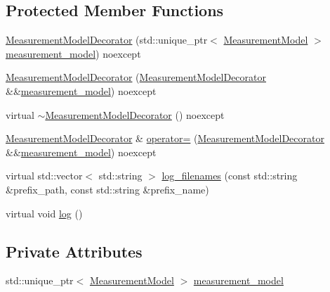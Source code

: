 \subsection*{Protected Member Functions}
\begin{DoxyCompactItemize}
\item 
\mbox{\hyperlink{classbfl_1_1MeasurementModelDecorator_aa49bbe1d5b707aa4419e1bee6a11ecad}{Measurement\+Model\+Decorator}} (std\+::unique\+\_\+ptr$<$ \mbox{\hyperlink{classbfl_1_1MeasurementModel}{Measurement\+Model}} $>$ \mbox{\hyperlink{classbfl_1_1MeasurementModelDecorator_a7d85e1d15d21ba2d0a70f86368628cf7}{measurement\+\_\+model}}) noexcept
\item 
\mbox{\hyperlink{classbfl_1_1MeasurementModelDecorator_ad2b03c9843ee16fe2253ea9b0bd18031}{Measurement\+Model\+Decorator}} (\mbox{\hyperlink{classbfl_1_1MeasurementModelDecorator}{Measurement\+Model\+Decorator}} \&\&\mbox{\hyperlink{classbfl_1_1MeasurementModelDecorator_a7d85e1d15d21ba2d0a70f86368628cf7}{measurement\+\_\+model}}) noexcept
\item 
virtual \mbox{\hyperlink{classbfl_1_1MeasurementModelDecorator_ac32603f06174b8eba271d5237d0ef566}{$\sim$\+Measurement\+Model\+Decorator}} () noexcept
\item 
\mbox{\hyperlink{classbfl_1_1MeasurementModelDecorator}{Measurement\+Model\+Decorator}} \& \mbox{\hyperlink{classbfl_1_1MeasurementModelDecorator_a6878f03475e8bb85719af07e5313f665}{operator=}} (\mbox{\hyperlink{classbfl_1_1MeasurementModelDecorator}{Measurement\+Model\+Decorator}} \&\&\mbox{\hyperlink{classbfl_1_1MeasurementModelDecorator_a7d85e1d15d21ba2d0a70f86368628cf7}{measurement\+\_\+model}}) noexcept
\item 
virtual std\+::vector$<$ std\+::string $>$ \mbox{\hyperlink{classbfl_1_1Logger_a328ceaa8e70e6918f11142b12b8be217}{log\+\_\+filenames}} (const std\+::string \&prefix\+\_\+path, const std\+::string \&prefix\+\_\+name)
\item 
virtual void \mbox{\hyperlink{classbfl_1_1Logger_ad44f46593cb8c4c87c1178eb326e2f64}{log}} ()
\end{DoxyCompactItemize}
\subsection*{Private Attributes}
\begin{DoxyCompactItemize}
\item 
std\+::unique\+\_\+ptr$<$ \mbox{\hyperlink{classbfl_1_1MeasurementModel}{Measurement\+Model}} $>$ \mbox{\hyperlink{classbfl_1_1MeasurementModelDecorator_a7d85e1d15d21ba2d0a70f86368628cf7}{measurement\+\_\+model}}
\end{DoxyCompactItemize}


